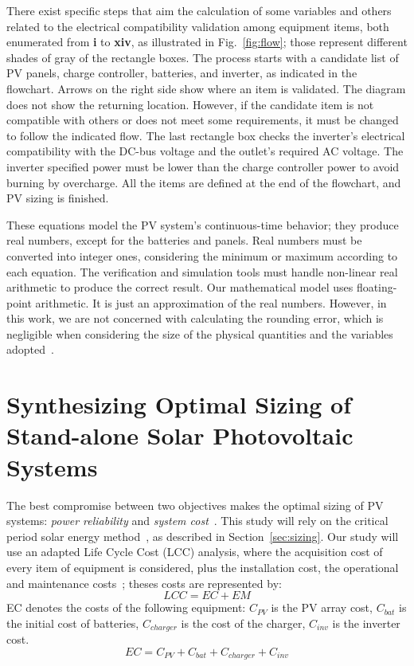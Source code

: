 \documentclass[journal]{IEEEtran}
\begin{document}
There exist specific steps that aim the calculation of some variables and others related to the electrical compatibility validation among equipment items, both enumerated from \textbf{i} to \textbf{xiv}, as illustrated in Fig.~\ref{fig:flow}; those represent different shades of gray of the rectangle boxes. The process starts with a candidate list of PV panels, charge controller, batteries, and inverter, as indicated in the flowchart. Arrows on the right side show where an item is validated. The diagram does not show the returning location. However, if the candidate item is not compatible with others or does not meet some requirements, it must be changed to follow the indicated flow. The last rectangle box checks the inverter's electrical compatibility with the DC-bus voltage and the outlet's required AC voltage. The inverter specified power must be lower than the charge controller power to avoid burning by overcharge. All the items are defined at the end of the flowchart, and PV sizing is finished.
 

These equations model the PV system's continuous-time behavior; they produce real numbers, except for the batteries and panels. Real numbers must be converted into integer ones, considering the minimum or maximum according to each equation. The verification and simulation tools must handle non-linear real arithmetic to produce the correct result. Our mathematical model uses floating-point arithmetic. It is just an approximation of the real numbers. However, in this work, we are not concerned with calculating the rounding error, which is negligible when considering the size of the physical quantities and the variables adopted~\cite{DBLP:journals/corr/abs-2004-12699}.

\section{Synthesizing Optimal Sizing of Stand-alone Solar Photovoltaic Systems}
\label{sec:SynthesizingOptimalSolarPhotovoltaicSystems}
The best compromise between two objectives makes the optimal sizing of PV systems: \textit{power reliability} and \textit{system cost}~\cite{Alsadi2018}. This study will rely on the critical period solar energy method~\cite{Pinho}, as described in Section~\ref{sec:sizing}. Our study will use an adapted Life Cycle Cost (LCC) analysis, where the acquisition cost of every item of equipment is considered, plus the installation cost, the operational and maintenance costs~\cite{Alsadi2018}; theses costs are represented by:
\begin{equation}
\label{eq:LCC}
LCC = EC + EM
\end{equation}
%
\noindent EC denotes the costs of the following equipment: $C_{PV}$ is the PV array cost, $C_{bat}$ is the initial cost of batteries, $C_{charger}$ is the cost of the charger, $C_{inv}$ is the inverter cost.
\begin{equation}
\label{eq:EquipamentCost}
EC = C_{PV} + C_{bat} + C_{charger} + C_{inv}
\end{equation}
\end{document}
